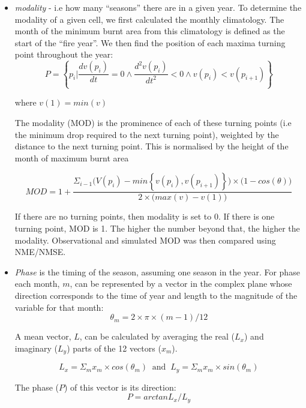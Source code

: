 \begin{itemize}
    \item \textit{modality} - i.e how many “seasons” there are in a given year. To determine the modality of a given cell, we first calculated the monthly climatology. The month of the minimum burnt area from this climatology is defined as the start of the “fire year”. We then find the position of each maxima turning point throughout the year:	
\begin{equation}
    P = \left\{p_i | \frac{dv(p_i)}{dt} = 0 \wedge \frac{d^2v(p_i)}{dt^2} < 0 \wedge v(p_i) < v(p_{i+1}) \right\}
\end{equation}

where $v(1) = min(v)$

The modality (MOD) is the prominence of each of these turning points (i.e the minimum drop required to the next turning point), weighted by the distance to the next turning point. This is normalised by the height of the month of maximum burnt area

\begin{equation}
    MOD =1 + \frac{ \Sigma_{i-1} \big( V(p_i) - min\left\{ v(p_i), v(p_{i+1}) \right\} \big) \times \big( 1 - cos(\theta) \big)}{2 \times \big(max(v) - v(1) \big)}
\end{equation}

If there are no turning points, then modality is set to 0. If there is one turning point, MOD is 1. The higher the number beyond that, the higher the modality. Observational and simulated MOD  was then compared using NME/NMSE.

    \item \textit{Phase} is the timing of the season, assuming one season in the year. For phase each month, $m$, can be represented by a vector in the complex plane whose direction corresponds to the time of year and length to the magnitude of the variable for that month:
\begin{equation}
    \theta_m = 2 \times \pi \times (m-1) / 12
\end{equation}

A mean vector, $L$, can be calculated by averaging the real ($L_x$) and imaginary ($L_y$) parts of the 12 vectors ($x_m$).

\begin{equation}
    L_x = \Sigma_m x_m \times cos(\theta_m) \ \text{   and   } \
    L_y = \Sigma_m x_m \times sin(\theta_m)
\end{equation}

The phase ($P$) of this vector is its direction:
\begin{equation}
    P  = arctan{L_x/L_y}
\end{equation}


\end{itemize}
